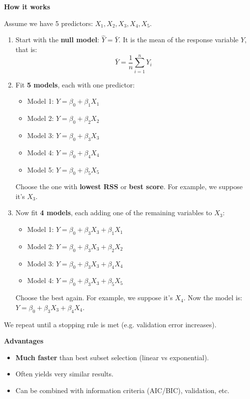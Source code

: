 \highspace
\begin{flushleft}
    \textcolor{Green3}{ \textbf{How it works}}
\end{flushleft}
Assume we have 5 predictors: $X_1, X_2, X_3, X_4, X_5$.
\begin{enumerate}
    \item Start with the \textbf{null model}: $\hat{Y} = \bar{Y}$. It is the mean of the response variable $Y$, that is:
    \begin{equation*}
        \bar{Y} = \dfrac{1}{n}\displaystyle\sum_{i=1}^{n} Y_i
    \end{equation*}
    \item Fit \textbf{5 models}, each with one predictor:
    \begin{itemize}
        \item Model 1: $Y = \beta_0 + \beta_1 X_1$
        \item Model 2: $Y = \beta_0 + \beta_2 X_2$
        \item Model 3: $Y = \beta_0 + \beta_3 X_3$
        \item Model 4: $Y = \beta_0 + \beta_4 X_4$
        \item Model 5: $Y = \beta_0 + \beta_5 X_5$
    \end{itemize}
    Choose the one with \textbf{lowest RSS} or \textbf{best score}. For example, we suppose it's $X_3$.
    \item Now fit \textbf{4 models}, each adding one of the remaining variables to $X_3$:
    \begin{itemize}
        \item Model 1: $Y = \beta_0 + \beta_3 X_3 + \beta_1 X_1$
        \item Model 2: $Y = \beta_0 + \beta_3 X_3 + \beta_2 X_2$
        \item Model 3: $Y = \beta_0 + \beta_3 X_3 + \beta_4 X_4$
        \item Model 4: $Y = \beta_0 + \beta_3 X_3 + \beta_5 X_5$
    \end{itemize}
    Choose the best again. For example, we suppose it's $X_4$. Now the model is: $Y = \beta_0 + \beta_3 X_3 + \beta_4 X_4$.
\end{enumerate}
We repeat until a stopping rule is met (e.g. validation error increases).

\newpage

\begin{flushleft}
    \textcolor{Green3}{ \textbf{Advantages}}
\end{flushleft}
\begin{itemize}
    \item[\textcolor{Green3}{\faIcon{\speedIcon}}] \textbf{Much faster} than best subset selection (linear vs exponential).
    \item Often yields very similar results.
    \item Can be combined with information criteria (AIC/BIC), validation, etc.
\end{itemize}

